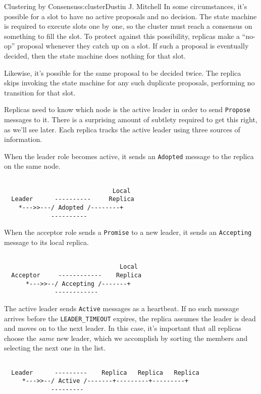 \begin{aosachapter}{Clustering by Consensus}{s:cluster}{Dustin J. Mitchell}
In some circumstances, it's possible for a slot to have no active
proposals and no decision. The state machine is required to execute
slots one by one, so the cluster must reach a consensus on something to
fill the slot. To protect against this possibility, replicas make a
``no-op'' proposal whenever they catch up on a slot. If such a proposal
is eventually decided, then the state machine does nothing for that
slot.

Likewise, it's possible for the same proposal to be decided twice. The
replica skips invoking the state machine for any such duplicate
proposals, performing no transition for that slot.

Replicas need to know which node is the active leader in order to send
\texttt{Propose} messages to it. There is a surprising amount of
subtlety required to get this right, as we'll see later. Each replica
tracks the active leader using three sources of information.

When the leader role becomes active, it sends an \texttt{Adopted}
message to the replica on the same node.

\begin{verbatim}

                              Local 
  Leader      ----------     Replica
    *--->>---/ Adopted /--------+
             ----------
\end{verbatim}

When the acceptor role sends a \texttt{Promise} to a new leader, it
sends an \texttt{Accepting} message to its local replica.

\begin{verbatim}

                                Local 
  Acceptor     ------------    Replica
      *--->>--/ Accepting /-------+
              ------------
\end{verbatim}

The active leader sends \texttt{Active} messages as a heartbeat. If no
such message arrives before the \texttt{LEADER\_TIMEOUT} expires, the
replica assumes the leader is dead and moves on to the next leader. In
this case, it's important that all replicas choose the \emph{same} new
leader, which we accomplish by sorting the members and selecting the
next one in the list.

\begin{verbatim}

  Leader      ---------    Replica   Replica   Replica
     *--->>--/ Active /-------+---------+---------+
             ---------
\end{verbatim}


\end{aosachapter}
